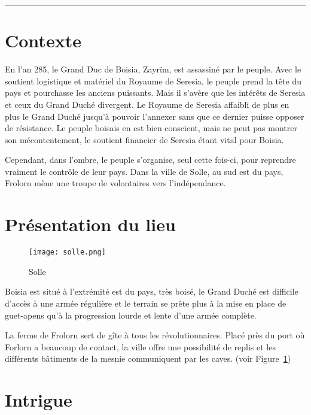 \documentclass[french, a4paper, 12pt]{article}
\begin{document}
 \maketitle \vspace{3pt} \hrule \vspace{3pt}

\tableofcontents



\section{Contexte}

En l'an 285, le Grand Duc de Boisia, Zayrïm, est assassiné par le peuple. Avec le soutient logistique et matériel du Royaume de Seresia, le peuple prend la tête du pays et pourchasse les anciens puissants. Mais il s'avère que les intérêts de Seresia et ceux du Grand Duché divergent. Le Royaume de Seresia affaibli de plus en plus le Grand Duché jusqu'à pouvoir l'annexer sans que ce dernier puisse opposer de résistance. Le peuple boisais en est bien conscient, mais ne peut pas montrer son mécontentement, le soutient financier de Seresia étant vital pour Boisia.

Cependant, dans l'ombre, le peuple s'organise, seul cette fois-ci, pour reprendre vraiment le contrôle de leur pays. Dans la ville de Solle, au sud est du pays, Frolorn mène une troupe de volontaires vers l'indépendance.

\section{Présentation du lieu}

\begin{figure}[htp]
\centering
\texttt{[image: solle.png]}
\caption{Solle}
\label{solle}
\end{figure}

Boisia est situé à l'extrémité est du pays, très boisé, le Grand Duché est difficile d'accès à une armée régulière et le terrain se prête plus à la mise en place de guet-apens qu'à la progression lourde et lente d'une armée complète.

La ferme de Frolorn sert de gîte à tous les révolutionnaires. Placé près du port où Forlorn a beaucoup de contact, la ville offre une possibilité de replis et les différents bâtiments de la mesnie communiquent par les caves. (voir Figure~\ref{solle})

\section{Intrigue}
\end{document}
